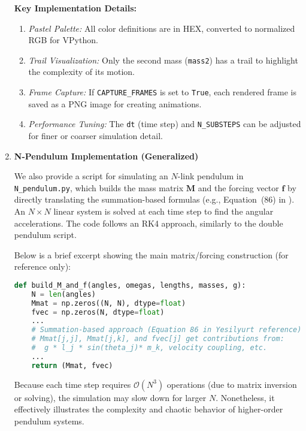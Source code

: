 \documentclass[letterpaper,12pt]{article}
\begin{document}
\begin{enumerate}[leftmargin=*, itemsep=1em]
\textbf{Key Implementation Details:}
\begin{enumerate}[itemsep=2pt, label=(\roman*)]
    \item \textit{Pastel Palette:} All color definitions are in HEX, converted to normalized RGB for VPython.
    \item \textit{Trail Visualization:} Only the second mass (\texttt{mass2}) has a trail to highlight the complexity of its motion.
    \item \textit{Frame Capture:} If \texttt{CAPTURE\_FRAMES} is set to \texttt{True}, each rendered frame is saved as a PNG image for creating animations.
    \item \textit{Performance Tuning:} The \texttt{dt} (time step) and \texttt{N\_SUBSTEPS} can be adjusted for finer or coarser simulation detail.
\end{enumerate}

\item \textbf{N-Pendulum Implementation (Generalized)}
\label{sec:NPendulumImplementation}

We also provide a script for simulating an $N$-link pendulum in \texttt{N\_pendulum.py}, which builds the mass matrix $\mathbf{M}$ and the forcing vector $\mathbf{f}$ by directly translating the summation-based formulas (e.g., Equation~(86) in \cite{yesilyurt2020equationsmotionformulationpendulum}). An $N\times N$ linear system is solved at each time step to find the angular accelerations. The code follows an RK4 approach, similarly to the double pendulum script.

Below is a brief excerpt showing the main matrix/forcing construction (for reference only):

\begin{lstlisting}[language=Python, caption=Excerpt from N\_pendulum.py (Matrix Construction)]
def build_M_and_f(angles, omegas, lengths, masses, g):
    N = len(angles)
    Mmat = np.zeros((N, N), dtype=float)
    fvec = np.zeros(N, dtype=float)
    ...
    # Summation-based approach (Equation 86 in Yesilyurt reference)
    # Mmat[j,j], Mmat[j,k], and fvec[j] get contributions from:
    #  g * l_j * sin(theta_j)* m_k, velocity coupling, etc.
    ...
    return (Mmat, fvec)
\end{lstlisting}

Because each time step requires $\mathcal{O}(N^3)$ operations (due to matrix inversion or solving), the simulation may slow down for larger $N$. Nonetheless, it effectively illustrates the complexity and chaotic behavior of higher-order pendulum systems.


\end{enumerate}
\end{document}
